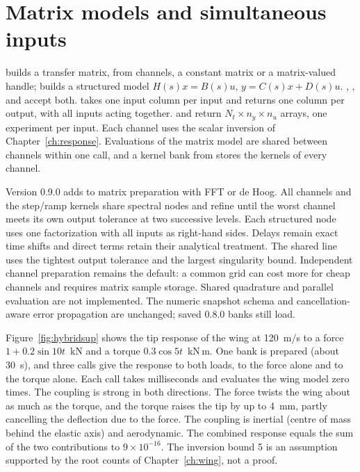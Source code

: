 \section{Matrix models and simultaneous inputs}

 builds a transfer matrix, from channels, a constant matrix
or a matrix-valued handle;  builds a structured model
$H(s)x=B(s)u$, $y=C(s)x+D(s)u$. , ,
 and  accept both.  takes one
input column per input and returns one column per output, with all
inputs acting together.  and  return
$N_t\times n_y\times n_u$ arrays, one experiment per input. Each channel
uses the scalar inversion of Chapter~\ref{ch:response}. Evaluations of the
matrix model are shared between channels within one call, and a kernel
bank from  stores the kernels of every channel.

Version 0.9.0 adds  to matrix 
preparation with FFT or de Hoog. All channels and the step/ramp kernels
share spectral nodes and refine until the worst channel meets its own
output tolerance at two successive levels. Each structured node uses one
factorization with all inputs as right-hand sides. Delays remain exact time
shifts and direct terms retain their analytical treatment. The shared line
uses the tightest output tolerance and the largest singularity bound.
Independent channel preparation remains the default: a common grid can
cost more for cheap channels and requires matrix sample storage. Shared
quadrature and parallel evaluation are not implemented. The numeric
snapshot schema and cancellation-aware  error propagation are
unchanged; saved 0.8.0 banks still load.


Figure~\ref{fig:hybridsup} shows the tip response of the wing at
120~m/s to a force $1+0.2\sin10t$~kN and a torque $0.3\cos5t$~kN\,m. One
bank is prepared (about 30~s), and three  calls give the
response to both loads, to the force alone and to the torque alone. Each
call takes milliseconds and evaluates the wing model zero times. The
coupling is strong in both directions. The force twists the wing about as
much as the torque, and the torque raises the tip by up to 4~mm, partly
cancelling the deflection due to the force. The coupling is inertial
(centre of mass behind the elastic axis) and aerodynamic. The combined
response equals the sum of the two contributions to $9\times10^{-16}$. The inversion bound 5 is an assumption
supported by the root counts of Chapter~\ref{ch:wing}, not a proof.

